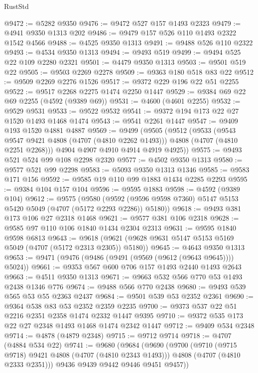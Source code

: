 \begin{lexlean}{RustStd}
\begin{coremodule}
@9472 := @5282 @9350
@9476 := @9472 @527 @157 @1493 @2323
@9479 := @4941 @9350 @1313 @202
@9486 := @9479 @157 @526 @110 @1493 @2322 @1542 @4566
@9488 := @4525 @9350 @1313
@9491 := @9488 @526 @110 @2322
@9493 := @4534 @9350 @1313
@9494 := @9493 @519
@9499 := @9494 @525 @22 @109 @2280 @2321
@9501 := @4479 @9350 @1313
@9503 := @9501 @519 @22
@9505 := @9503 @2269 @2278
@9509 := @9363 @180 @518 @83 @22
@9512 := @9509 @2269 @2276 @1526
@9517 := @9372 @229 @196 @22 @51 @2255
@9522 := @9517 @2268 @2275 @1474 @2250 @1447
@9529 := @9384 @69 @22 @69 @2255 (@4592 (@9389 @69))
@9531 := @4600 (@4601 @2255)
@9532 := @9529 @9531
@9533 := @9522 @9532
@9541 := @9372 @194 @173 @22 @27 @1520 @1493 @1468 @1474
@9543 := @9541 @2261 @1447
@9547 := @9409 @193 @1520 @4881 @4887
@9569 := @9499
    (@9505
      (@9512
        (@9533
          (@9543 @9547 @9421 @4808 (@4707 (@4810 @2262 @1493)))
          @4808
          (@4707 (@4810 @2251 @2268)))
        @4904
        @4907
        @4910
        @4914
        @4919
        @4925))
@9575 := @9493 @521 @524 @99 @108 @2298 @2320
@9577 := @4502 @9350 @1313
@9580 := @9577 @521 @99 @2298
@9583 := @5093 @9350 @1313 @1346
@9585 := @9583 @171 @156
@9592 := @9585 @19 @110 @99 @1883 @1434 @2285 @2293
@9595 := @9384 @104 @157 @104
@9596 := @9595 @1883
@9598 := @4592 (@9389 @104)
@9612 := @9575
    (@9580 (@9592 (@9596 @9598 @7360) @5147 @5153 @5420 @5049 (@4707 (@5172 @2293 @2286)) @5180))
@9618 := @9493 @381 @173 @106 @27 @2318 @1468
@9621 := @9577 @381 @106 @2318
@9628 := @9585 @97 @110 @106 @1840 @1434 @2304 @2313
@9631 := @9595 @1840 @9598 @6813
@9643 := @9618 (@9621 (@9628 @9631 @5147 @5153 @5169 @5049 (@4707 (@5172 @2313 @2305)) @5180))
@9645 := @4643 @9350 @1313
@9653 := @9471 (@9476 (@9486 (@9491 (@9569 (@9612 (@9643 @9645)))) @5024))
@9661 := @9353 @567 @600 @706 @157 @1493 @2440 @1493 @2643
@9663 := @4511 @9350 @1313
@9671 := @9663 @532 @566 @770 @53 @1493 @2438 @1346 @776
@9674 := @9488 @566 @770 @2438
@9680 := @9493 @539 @565 @53 @55 @2363 @2437
@9684 := @9501 @539 @53 @2352 @2361
@9690 := @9364 @538 @83 @53 @2352 @2359 @2235
@9700 := @9373 @537 @22 @51 @2216 @2351 @2358 @1474 @2332 @1447 @9395
@9710 := @9372 @535 @173 @22 @27 @2348 @1493 @1468 @1474 @2342 @1447
@9712 := @9409 @534 @2348
@9714 := @4878 (@4879 @2348)
@9715 := @9712 @9714
@9718 := @4707 (@4884 @534 @22)
@9741 := @9680
    (@9684
      (@9690
        (@9700
          (@9710 (@9715 @9718) @9421 @4808 (@4707 (@4810 @2343 @1493)))
          @4808
          (@4707 (@4810 @2333 @2351)))
        @9436
        @9439
        @9442
        @9446
        @9451
        @9457))

\end{coremodule}
\end{lexlean}
